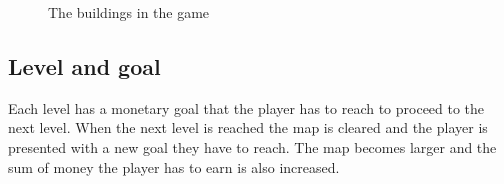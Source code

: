     \begin{figure}[!ht]
    \centering

    \caption{The buildings in the game}
    \end{figure}

\subsection*{Level and goal}
    Each level has a monetary goal that the player has to reach to proceed to the next level. When 
    the next level is reached the map is cleared and the player is presented with a new goal they 
    have to reach. The map becomes larger and the sum of money the player has to earn is also increased.
